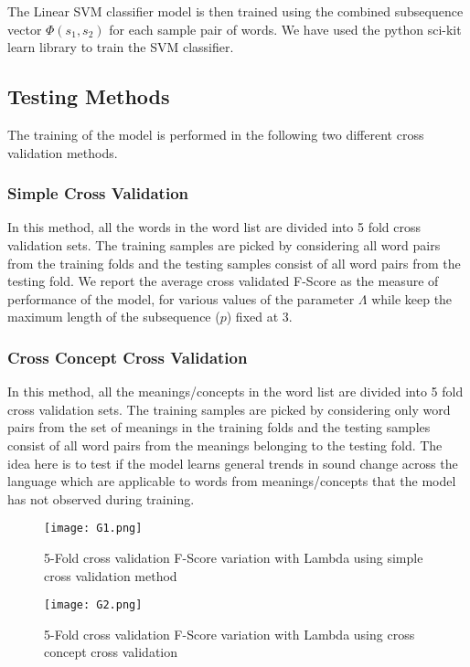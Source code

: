 \documentclass[journal]{IEEEtran}
\begin{document}
The Linear SVM classifier model is then trained using the combined subsequence vector $\Phi(s_1, s_2)$ for each sample pair of words. We have used the python sci-kit learn library to train the SVM classifier. 

\subsection{Testing Methods}
The training of the model is performed in the following two different cross validation methods.

\subsubsection{Simple Cross Validation}
In this method, all the words in the word list are divided into 5 fold cross validation sets. The training samples are picked by considering all word pairs from the training folds and the testing samples consist of all word pairs from the testing fold. We report the average cross validated F-Score as the measure of performance of the model, for various values of the parameter $\Lambda$ while keep the maximum length of the subsequence ($p$) fixed at 3.

\subsubsection{Cross Concept Cross Validation}
In this method, all the meanings/concepts in the word list are divided into 5 fold cross validation sets. The training samples are picked by considering only word pairs from the set of meanings in the training folds and the testing samples consist of all word pairs from the meanings belonging to the testing fold. The idea here is to test if the model learns general trends in sound change across the language which are applicable to words from meanings/concepts that the model has not observed during training.

\begin{figure}[ht]
\centering
\texttt{[image: G1.png]}
\caption{5-Fold cross validation F-Score variation with Lambda using simple cross validation method}
\end{figure}

\begin{figure}[ht]
\centering
\texttt{[image: G2.png]}
\caption{5-Fold cross validation F-Score variation with Lambda using cross concept cross validation}
\end{figure}
\end{document}
